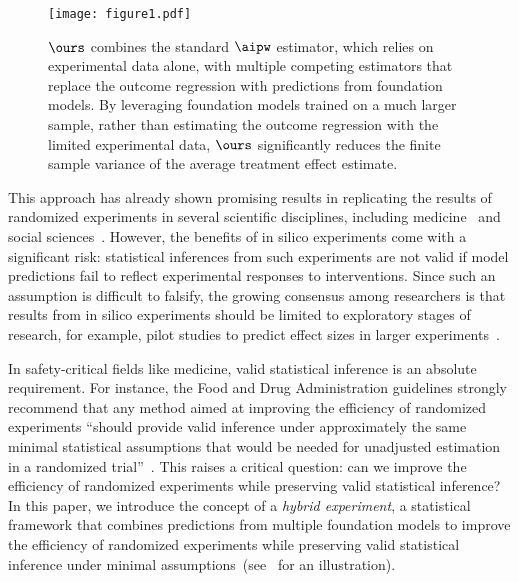  
 \begin{figure*}
 \centering 
\texttt{[image: figure1.pdf]} 
    \caption{ \small{$\ours$ combines the standard $\aipw$ estimator, which relies on experimental data alone, with multiple competing estimators that replace the outcome regression with predictions from foundation models. By leveraging foundation models trained on a much larger sample, rather than estimating the outcome regression with the limited experimental data, $\ours$ significantly reduces the finite sample variance of the average treatment effect estimate. }}
    \label{fig:setting} 
\end{figure*}
This approach has already shown promising results in replicating the results of randomized experiments in several scientific disciplines, including medicine~\citep{dhawan2024end} and social sciences~\citep{argyle2023out,bail2024can,ashokkumar2024predicting}. However, the benefits of in silico
experiments come with a significant risk:  statistical inferences from such experiments are not valid if model predictions fail to reflect experimental responses to interventions. Since such an assumption is difficult to falsify, the growing consensus among researchers is that results from in silico experiments should be limited to exploratory stages of research, for example, pilot studies to predict effect sizes in larger experiments~\citep{grossmann2023ai}. 



In safety-critical fields like medicine, valid statistical inference is an absolute requirement. For instance, the Food and Drug Administration guidelines strongly recommend that any method aimed at improving the efficiency of randomized experiments ``should provide valid inference under approximately the same minimal statistical assumptions that would be needed for unadjusted estimation in a randomized trial''~\citep{fda2021guide}. This raises a critical question: can we improve the efficiency of randomized experiments while preserving valid statistical inference? In this paper, we introduce the concept of a \emph{hybrid experiment}, a statistical framework that combines predictions from multiple foundation models to improve the efficiency of randomized experiments while preserving valid statistical inference under minimal assumptions~(see~ for an illustration).




